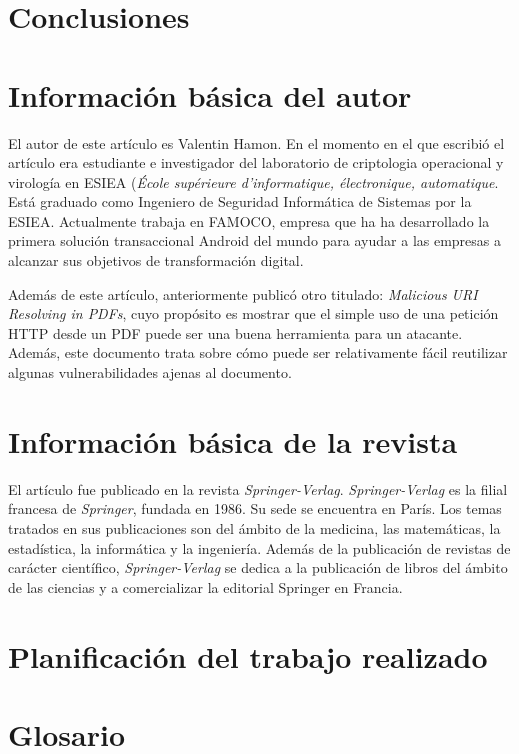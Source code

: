 \documentclass[a4paper,11pt]{report}
\begin{document}
\chapter{Conclusiones}






\chapter*{Información básica del autor}
El autor de este artículo es Valentin Hamon. En el momento en el que escribió el artículo era estudiante e investigador del laboratorio de criptologia operacional y virología en ESIEA (\emph{École supérieure d'informatique, électronique, automatique}. Está graduado como Ingeniero de Seguridad Informática de Sistemas por la ESIEA. Actualmente trabaja en FAMOCO, empresa que ha ha desarrollado la primera solución transaccional Android del mundo para ayudar a las empresas a alcanzar sus objetivos de transformación digital.

Además de este artículo, anteriormente publicó otro titulado: \emph{Malicious URI Resolving in PDFs}, cuyo propósito es mostrar que el simple uso de una petición HTTP desde un PDF puede ser una buena herramienta  para un atacante. Además, este documento trata sobre cómo puede ser relativamente fácil reutilizar algunas vulnerabilidades ajenas al documento. 

\chapter*{Información básica de la revista}

El artículo fue publicado en la revista \emph{Springer-Verlag}. \emph{Springer-Verlag} es la filial francesa de \emph{Springer}, fundada en 1986. Su sede se encuentra en París. Los temas tratados en sus publicaciones son del ámbito de la medicina, las matemáticas, la estadística, la informática y la ingeniería. Además de la publicación de revistas de carácter científico, \emph{Springer-Verlag} se dedica a la publicación de libros del ámbito de las ciencias y a comercializar la editorial Springer en Francia. 


\chapter*{Planificación del trabajo realizado}


\chapter*{Glosario}
\end{document}
